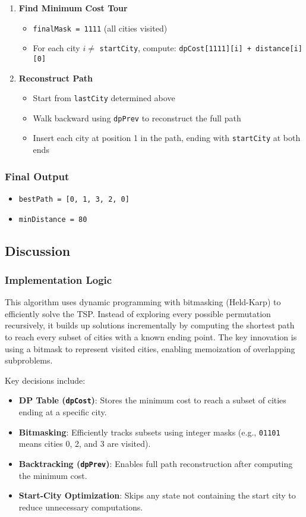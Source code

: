 \documentclass{article}
\begin{document}
\begin{enumerate}
    \item \textbf{Find Minimum Cost Tour}
    \begin{itemize}
        \item \texttt{finalMask = 1111} (all cities visited)
        \item For each city $i \ne$ \texttt{startCity}, compute: \texttt{dpCost[1111][i] + distance[i][0]}
    \end{itemize}

    \item \textbf{Reconstruct Path}
    \begin{itemize}
        \item Start from \texttt{lastCity} determined above
        \item Walk backward using \texttt{dpPrev} to reconstruct the full path
        \item Insert each city at position 1 in the path, ending with \texttt{startCity} at both ends
    \end{itemize}
\end{enumerate}
\subsubsection*{Final Output}
\begin{itemize}
    \item \texttt{bestPath = [0, 1, 3, 2, 0]}
    \item \texttt{minDistance = 80}
\end{itemize}

\subsection*{Discussion}
\subsubsection*{Implementation Logic}
This algorithm uses dynamic programming with bitmasking (Held-Karp) to efficiently solve the TSP. Instead of exploring every possible permutation recursively, it builds up solutions incrementally by computing the shortest path to reach every subset of cities with a known ending point. The key innovation is using a bitmask to represent visited cities, enabling memoization of overlapping subproblems.

Key decisions include:
\begin{itemize}
    \item \textbf{DP Table (\texttt{dpCost})}: Stores the minimum cost to reach a subset of cities ending at a specific city.
    \item \textbf{Bitmasking}: Efficiently tracks subsets using integer masks (e.g., \texttt{01101} means cities 0, 2, and 3 are visited).
    \item \textbf{Backtracking (\texttt{dpPrev})}: Enables full path reconstruction after computing the minimum cost.
    \item \textbf{Start-City Optimization}: Skips any state not containing the start city to reduce unnecessary computations.
\end{itemize}
\end{document}
